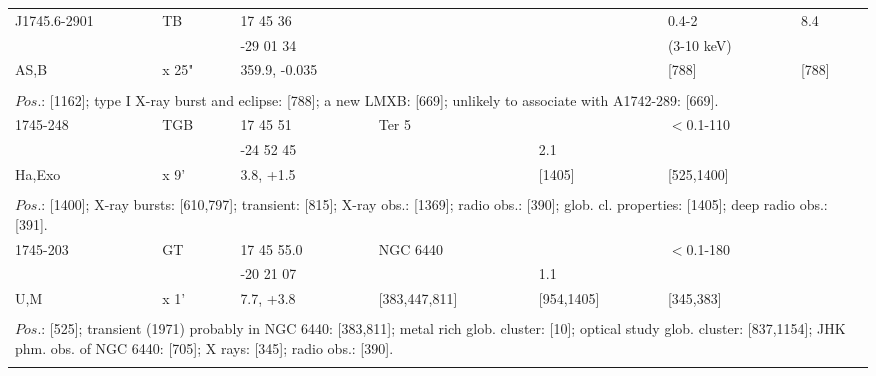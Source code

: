 \documentclass{aa}
\begin{document}
\begin{tabular}{p{2.5cm}p{1cm}p{1.8cm}p{2.3cm}p{3.3cm}p{2.0cm}p{2.2cm}}
\noalign{\smallskip}
J1745.6-2901  & TB         & 17 45 36            &                     &                     & 0.4-2              & 8.4     \\
                           &               & -29 01 34           &                     &                     & (3-10 keV)    &           \\
AS,B                 & x 25"     & 359.9, -0.035    &                     &                     & [788]               & [788]   \\
\\
\multicolumn{7}{p{17.5cm}}{
$Pos$.: [1162]; type I X-ray burst and eclipse: [788]; a new LMXB: [669]; unlikely to associate with A1742-289: [669].}\\
\noalign{\smallskip}
\hline

\noalign{\smallskip}
1745-248         & TGB       & 17 45 51                  & Ter 5         &                       & $<$0.1-110           &           \\
                          &                 & -24 52 45                 &                    & 2.1                &                                &               \\
Ha,Exo            & x 9'          & 3.8, +1.5                   &                    &  [1405]         & [525,1400]             &         \\
\\
\multicolumn{7}{p{17.5cm}}{
$Pos$.: [1400]; X-ray bursts: [610,797]; transient: [815]; X-ray obs.: [1369]; radio obs.: [390]; glob. cl. properties: 
[1405]; deep radio obs.: [391].}\\
\noalign{\smallskip}
\hline

\noalign{\smallskip}
1745-203         & GT                & 17 45 55.0            & NGC 6440            &                           & $<$0.1-180       &       \\
                          &                       & -20 21 07              &                                & 1.1                     &                            &      \\
U,M                   & x 1'               & 7.7, +3.8                & [383,447,811]      & [954,1405]       & [345,383]           &   \\
\\ 
\multicolumn{7}{p{17.5cm}}{
$Pos$.: [525]; transient (1971) probably in NGC 6440: [383,811]; metal rich glob. cluster: [10]; optical study glob. 
cluster: [837,1154]; JHK phm. obs. of NGC 6440: [705]; X rays: [345]; radio obs.: [390].}\\
\noalign{\smallskip}
\hline


\end{tabular}
\end{document}
